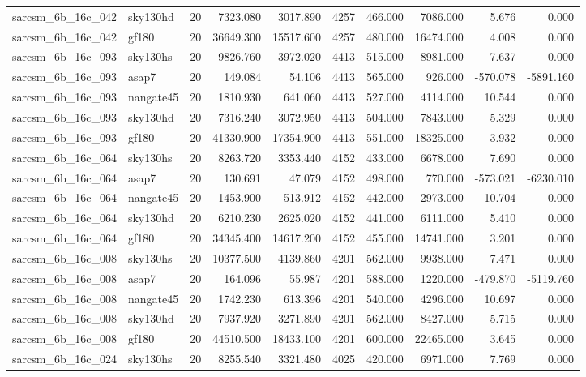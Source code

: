 \begin{longtable}{llrrrrrrrr}
sarcsm\_6b\_16c\_042 & sky130hd & 20 & 7323.080 & 3017.890 & 4257 & 466.000 & 7086.000 & 5.676 & 0.000 \\
sarcsm\_6b\_16c\_042 & gf180 & 20 & 36649.300 & 15517.600 & 4257 & 480.000 & 16474.000 & 4.008 & 0.000 \\
sarcsm\_6b\_16c\_093 & sky130hs & 20 & 9826.760 & 3972.020 & 4413 & 515.000 & 8981.000 & 7.637 & 0.000 \\
sarcsm\_6b\_16c\_093 & asap7 & 20 & 149.084 & 54.106 & 4413 & 565.000 & 926.000 & -570.078 & -5891.160 \\
sarcsm\_6b\_16c\_093 & nangate45 & 20 & 1810.930 & 641.060 & 4413 & 527.000 & 4114.000 & 10.544 & 0.000 \\
sarcsm\_6b\_16c\_093 & sky130hd & 20 & 7316.240 & 3072.950 & 4413 & 504.000 & 7843.000 & 5.329 & 0.000 \\
sarcsm\_6b\_16c\_093 & gf180 & 20 & 41330.900 & 17354.900 & 4413 & 551.000 & 18325.000 & 3.932 & 0.000 \\
sarcsm\_6b\_16c\_064 & sky130hs & 20 & 8263.720 & 3353.440 & 4152 & 433.000 & 6678.000 & 7.690 & 0.000 \\
sarcsm\_6b\_16c\_064 & asap7 & 20 & 130.691 & 47.079 & 4152 & 498.000 & 770.000 & -573.021 & -6230.010 \\
sarcsm\_6b\_16c\_064 & nangate45 & 20 & 1453.900 & 513.912 & 4152 & 442.000 & 2973.000 & 10.704 & 0.000 \\
sarcsm\_6b\_16c\_064 & sky130hd & 20 & 6210.230 & 2625.020 & 4152 & 441.000 & 6111.000 & 5.410 & 0.000 \\
sarcsm\_6b\_16c\_064 & gf180 & 20 & 34345.400 & 14617.200 & 4152 & 455.000 & 14741.000 & 3.201 & 0.000 \\
sarcsm\_6b\_16c\_008 & sky130hs & 20 & 10377.500 & 4139.860 & 4201 & 562.000 & 9938.000 & 7.471 & 0.000 \\
sarcsm\_6b\_16c\_008 & asap7 & 20 & 164.096 & 55.987 & 4201 & 588.000 & 1220.000 & -479.870 & -5119.760 \\
sarcsm\_6b\_16c\_008 & nangate45 & 20 & 1742.230 & 613.396 & 4201 & 540.000 & 4296.000 & 10.697 & 0.000 \\
sarcsm\_6b\_16c\_008 & sky130hd & 20 & 7937.920 & 3271.890 & 4201 & 562.000 & 8427.000 & 5.715 & 0.000 \\
sarcsm\_6b\_16c\_008 & gf180 & 20 & 44510.500 & 18433.100 & 4201 & 600.000 & 22465.000 & 3.645 & 0.000 \\
sarcsm\_6b\_16c\_024 & sky130hs & 20 & 8255.540 & 3321.480 & 4025 & 420.000 & 6971.000 & 7.769 & 0.000 \\

\end{longtable}
